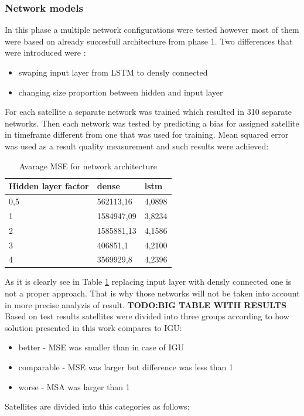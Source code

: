 \subsubsection{Network models}
In this phase a multiple network configurations were tested however most of them were based
on already succesfull architecture from phase 1.
Two differences that were introduced were :
\begin{itemize}
	\item swaping input layer from LSTM to densly connected
	\item changing size proportion between hidden and input layer
\end{itemize}
For each satellite a separate network was trained which resulted in 310 separate networks.
Then each network was tested by predicting a bias for assigned satellite in timeframe different
from one that was used for training. Mean squared error was used as a result quality measurement
and such results were achieved:
\begin{table}[ht] 
	\centering
	\caption{Avarage MSE for network architecture}
	\label{tab:phase_2_avarage_results}
	\begin{tabular}{lll}
		\hline
		\hline
		Hidden layer factor& dense & lstm  \\
		\hline
		0,5& 562113,16& 4,0898\\
		1& 1584947,09& 3,8234\\
		2& 1585881,13& 4,1586\\
		3& 406851,1& 4,2100\\
		4& 3569929,8& 4,2396\\
		\hline
		\hline
	\end{tabular}
\end{table}
As it is clearly see in Table \ref{tab:phase_2_avarage_results} replacing input layer with
densly connected one is not a proper approach. That is why those networks will not be taken
into account in more precise analyzis of result.
\textbf{TODO:BIG TABLE WITH RESULTS}
Based on test results satellites were divided into three groups according to how 
solution presented in this work compares to IGU:
\begin{itemize}
	\item better - MSE was smaller than in case of IGU
	\item comparable - MSE was larger but difference was less than 1
	\item worse - MSA was larger than 1
\end{itemize}
Satellites are divided into this categories as follows:
